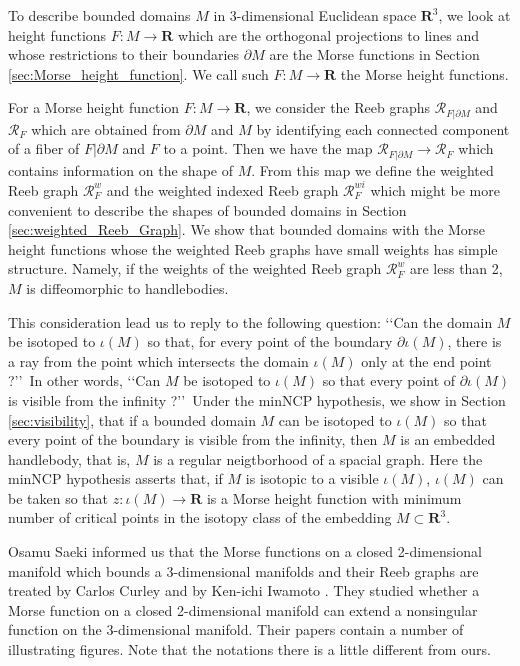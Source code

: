 \documentclass{amsart}
\numberwithin{equation}{section}
\newcommand{\RR}{{\boldsymbol{R}}}
\newcommand{\lra}{\longrightarrow}
\newcommand{\bd}{\partial}
\begin{document}
To describe  bounded domains $M$ in 3-dimensional Euclidean space $\RR^3$, we look at height functions $F:M\lra \RR$ which are the orthogonal projections to lines and whose restrictions to their boundaries $\bd M$ are the Morse functions in Section \ref{sec:Morse_height_function}.
 We call such $F:M\lra \RR$ the Morse height functions.

For a Morse height function $F:M\lra \RR$, we consider the Reeb graphs 
$\mathcal{R}_{F|\bd M}$ and $\mathcal{R}_F$ which are obtained from $\bd M$ and $M$ by identifying each connected component of a fiber of $F|\bd M$ and $F$ to a point. Then we have the map $\mathcal{R}_{F|\bd M}\lra \mathcal{R}_F$ which contains information on the shape of $M$. From this map we define the weighted Reeb graph $\mathcal{R}^w_F$ and the weighted indexed Reeb graph $\mathcal{R}^{wi}_F$ which might be more convenient to describe the shapes of bounded domains in Section \ref{sec:weighted_Reeb_Graph}.  We show that bounded domains with the Morse height functions whose the weighted Reeb graphs have small weights has simple structure. Namely, if the weights of the weighted Reeb graph $\mathcal{R}^w_F$ are less than 2, $M$ is diffeomorphic to handlebodies. 

This consideration lead us to reply to the following question: 
\lq\lq{}Can the domain $M$ be isotoped to $\iota(M)$ so that, for every point of the boundary $\partial \iota(M)$, there is a ray from the point which intersects the domain $\iota(M)$ only at the end point ?\rq\rq\ In other words, \lq\lq{}Can $M$ be isotoped to $\iota(M)$ so that every point of $\bd \iota (M)$ is visible from the infinity ?\rq\rq\ Under the minNCP hypothesis, 
we show in Section \ref{sec:visibility}, that if a bounded domain $M$ can be isotoped to $\iota(M)$ so that every point of the boundary is visible from the infinity, then $M$ is an embedded handlebody, that is, $M$ is a regular neigtborhood of a spacial graph.  Here the minNCP hypothesis asserts that, if $M$ is isotopic to a visible $\iota(M)$, $\iota(M)$ can be taken so that $z:\iota(M)\lra \RR$ is a Morse height function with minimum number of critical points in the isotopy class of the embedding $M\subset \RR^3$.

Osamu Saeki informed us that the Morse functions on a closed 2-dimensional manifold which bounds a 3-dimensional manifolds and their Reeb graphs are treated by Carlos Curley \cite{Curley} and by Ken-ichi Iwamoto \cite{Iwamoto}. They studied whether a Morse function on a closed 2-dimensional manifold can extend a nonsingular function on the 3-dimensional manifold. Their papers contain a number of illustrating figures. Note that the notations there is a little different from ours. 
\end{document}
